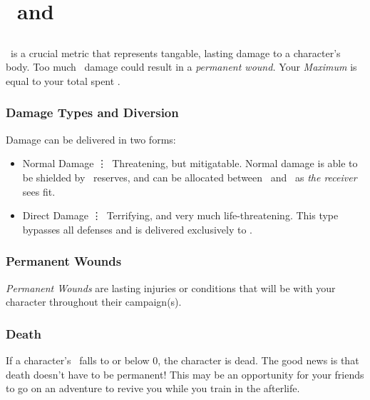\chapter{\HPful\ and \ENful}\label{ch:hp_and_en}

\section{\HPful\index{\HPful}}\label{sec:hp}

\HPful\ is a crucial metric that represents tangable, lasting damage
to a character's body. Too much \HPful\ damage could result in a
\textit{permanent wound.} Your \emph{Maximum \HPful} is equal to your total spent \attrval{}.


\subsection{Damage Types and Diversion}\label{subsec:damage_types}
Damage can be delivered in two forms:
\begin{itemize}
	\item Normal Damage \vdots\ Threatening, but mitigatable. Normal damage is able to be shielded by \ENful\ reserves, and can be allocated between \HPful\ and \ENful\ as \emph{the receiver} sees fit.
	\item Direct Damage \vdots\ Terrifying, and very much life-threatening. This type bypasses all defenses and is delivered exclusively to \HPful .
\end{itemize}

\subsection{Permanent Wounds}\label{subsec:wounds}
\emph{Permanent Wounds} are lasting injuries or conditions that will be with your character throughout their campaign(s).

\subsection{Death}\label{subsec:death}

If a character's \HPful\ falls to or below 0, the character is dead. The good news is that death doesn't have to be permanent!
This may be an opportunity for your friends to go on an adventure to revive you while you train in the afterlife.

